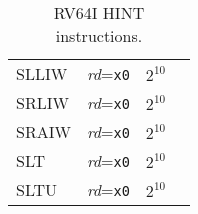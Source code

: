 \begin{table}[hbt]
\begin{tabular}{|l|l|c|l|}
  SLLIW                 & {\em rd}={\tt x0}                           & $2^{10}$                    & \\ \cline{1-3}
  SRLIW                 & {\em rd}={\tt x0}                           & $2^{10}$                    & \\ \cline{1-3}
  SRAIW                 & {\em rd}={\tt x0}                           & $2^{10}$                    & \\ \cline{1-3}
  SLT                   & {\em rd}={\tt x0}                           & $2^{10}$                    & \\ \cline{1-3}
  SLTU                  & {\em rd}={\tt x0}                           & $2^{10}$                    & \\ \hline
\end{tabular}
\caption{RV64I HINT instructions.}
\label{tab:rv64i-hints}
\end{table}
